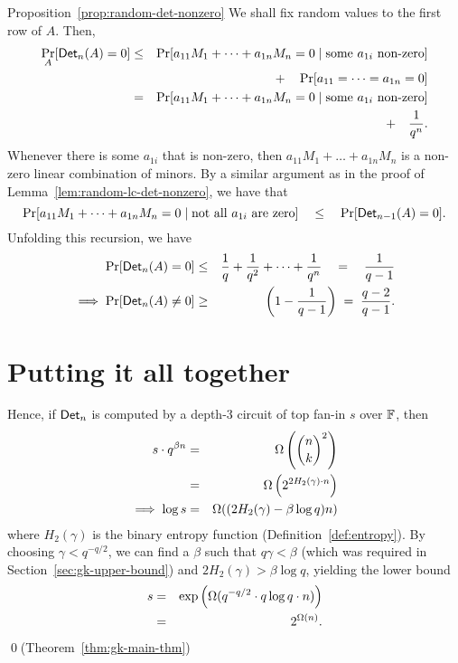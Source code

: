 \begin{proofof}{Proposition~\ref{prop:random-det-nonzero}}
We shall fix random values to the first row of $A$. Then,
\begin{eqnarray*}
\Pr_{A}[\mathsf{Det}_n(A) = 0] & \leq & \Pr[a_{11} M_1 + \dots + a_{1n} M_n = 0 \;|\;\text{some $a_{1i}$ non-zero}]\\
& &\quad + \quad \Pr[a_{11}=\dots = a_{1n} = 0]\\
 & = & \Pr[a_{11} M_1 + \dots + a_{1n} M_n = 0 \;|\;\text{some $a_{1i}$ non-zero}]\\
 & & \quad + \quad \frac{1}{q^n}.
\end{eqnarray*}
Whenever there is some $a_{1i}$ that is non-zero, then $a_{11}M_1 +
\dots + a_{1n}M_n$ is a non-zero linear combination of minors. By a similar argument as in the proof of Lemma~\ref{lem:random-lc-det-nonzero}, we have that
$$
\Pr[a_{11} M_1 + \dots + a_{1n}M_n = 0\;|\;\text{not all $a_{1i}$ are zero}] \quad \leq \quad \Pr[\mathsf{Det}_{n-1}(A) = 0].
$$
Unfolding this recursion, we have
\begin{eqnarray*}
\Pr[\mathsf{Det}_n(A) = 0] & \leq & \frac{1}{q} + \frac{1}{q^2} + \dots + \frac{1}{q^n} \quad=\quad \frac{1}{q-1}\\
\implies \Pr[\mathsf{Det}_n(A) \neq 0] & \geq & \left(1 - \frac{1}{q-1}\right) \;=\; \frac{q-2}{q-1}.
\end{eqnarray*}
\end{proofof}



\section{Putting it all together}

Hence, if $\mathsf{Det}_n$ is computed by a depth-3 circuit of top fan-in $s$ over $\mathbb{F}$, then 
\begin{eqnarray*}
s \cdot q^{\beta n} & = &  \Omega\left(\binom{n}{k}^2\right)\\
 & = & \Omega\left(2^{2H_2(\gamma)\cdot n}\right)\\
\implies \log s & = & \Omega((2H_2(\gamma) - \beta \log q)n)
\end{eqnarray*}
where $H_2(\gamma)$ is the binary entropy function (Definition~\ref{def:entropy}). 
By choosing $\gamma < q^{-q/2}$, we can find a $\beta$ such that
$q\gamma < \beta$ (which was required in
Section~\ref{sec:gk-upper-bound}) and $2H_2(\gamma) > \beta \log q$,
yielding the lower bound  
\begin{eqnarray*}
  s &=& \exp\left(\Omega(q^{-q/2}\cdot q\log q \cdot n)\right) \\
  & =& 2^{\Omega(n)}.
\end{eqnarray*}
\qed (Theorem~\ref{thm:gk-main-thm})



